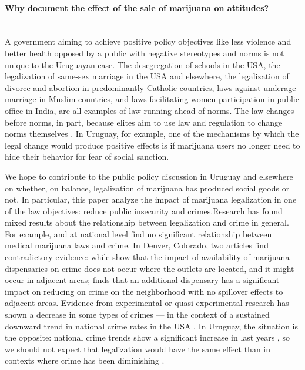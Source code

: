 \documentclass[11pt]{article}
\let\oldparagraph\paragraph
\renewcommand{\paragraph}[1]{\oldparagraph{#1}\mbox{}}
\begin{document}
\paragraph{Why document the effect of the sale of marijuana on attitudes?}\\
A government aiming to achieve positive policy objectives like less violence and better health opposed by a public with negative stereotypes and norms is not unique to the Uruguayan case. The desegregation of schools in the USA, the legalization of same-sex marriage in the USA and elsewhere, the legalization of divorce and abortion in predominantly Catholic countries, laws against underage marriage in Muslim countries, and laws facilitating women participation in public office in India, are all examples of law running ahead of norms. The law changes before norms, in part, because elites aim to use law and regulation to change norms themselves \citep{beaman2009powerful,Tankard:2016, Tankard:2017}. In Uruguay, for example, one of the mechanisms by which the legal change would produce positive effects is if marijuana users no longer need to hide their behavior for  fear of social sanction.

We hope to contribute to the public policy discussion in Uruguay and elsewhere on whether, on balance, legalization of marijuana has produced social goods or not. In particular, this paper analyze the impact of marijuana legalization in one of the law objectives: reduce public insecurity and crimes.Research has found mixed results about the relationship between legalization and crime in general. For example, \cite{braakmann2014cannabis} and \cite{chu2019joint} at national level find no significant relationship between medical marijuana laws and crime. In Denver, Colorado, two articles find contradictory evidence: while \citep {freisthler2016micro} show that the impact of availability of marijuana dispensaries on crime does not occur where the outlets are located, and it might occur in adjacent areas; \citep {brinkman2019not} finds that an additional dispensary has a significant impact on reducing on crime on the neighborhood with no spillover effects to adjacent areas. Evidence from experimental or quasi-experimental research has shown a decrease in some types of crimes \citep{dragone2019crime, gavrilova2014legal, hao2017cross, Indigo:2016} --- in the context of a  sustained downward trend in national crime rates in the USA \citep{gramlich5facts}. In Uruguay, the situation is the opposite: national crime trends show a significant increase in last years \citep{paternain2008panorama}, so we should not expect that legalization would have the same effect than in contexts where crime has been diminishing \citep {eisner2016achieving}.
\end{document}
